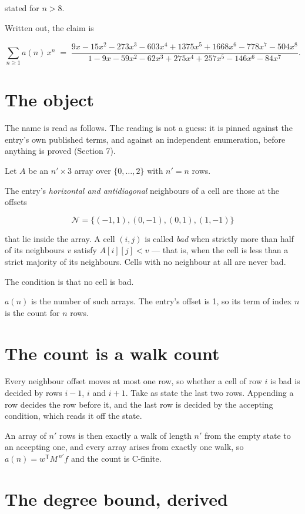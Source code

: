 \documentclass[11pt]{article}
\theoremstyle{definition}
\begin{document}
stated for $n > 8$.

Written out, the claim is

\[\sum_{n \ge 1} a(n)\,x^n \;=\; \frac{9x - 15x^{2} - 273x^{3} - 603x^{4} + 1375x^{5} + 1668x^{6} - 778x^{7} - 504x^{8}}{1 - 9x - 59x^{2} - 62x^{3} + 275x^{4} + 257x^{5} - 146x^{6} - 84x^{7}}.\]

\section{The object}

The name is read as follows. The reading is not a guess: it is pinned against the entry's own published terms, and against an independent enumeration, before anything is proved (Section 7).

Let $A$ be an $n' \times 3$ array over $\{0,\dots,2\}$ with $n' = n$ rows.

The entry's {\itshape horizontal and antidiagonal} neighbours of a cell are those at the offsets

\[\mathcal{N} = \{(-1,1), (0,-1), (0,1), (1,-1)\}\]

that lie inside the array. A cell $(i,j)$ is called {\itshape bad} when strictly more than half of its neighbours $v$ satisfy $A[i][j] < v$ --- that is, when the cell is less than a strict majority of its neighbours. Cells with no neighbour at all are never bad.

The condition is that no cell is bad.

$a(n)$ is the number of such arrays. The entry's offset is 1, so its term of index $n$ is the count for $n$ rows.

\section{The count is a walk count}

Every neighbour offset moves at most one row, so whether a cell of row $i$ is bad is decided by rows $i-1$, $i$ and $i+1$. Take as state the last two rows. Appending a row decides the row before it, and the last row is decided by the accepting condition, which reads it off the state.

An array of $n'$ rows is then exactly a walk of length $n'$ from the empty state to an accepting one, and every array arises from exactly one walk, so $a(n) = w^{\mathsf T}M^{\,n'}f$ and the count is C-finite.

\section{The degree bound, derived}
\end{document}
